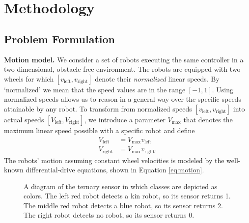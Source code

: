 \documentclass[letterpaper, 10 pt, conference]{ieeeconf}
\newcommand{\myparagraph}[1]{\textbf{#1.}}
\begin{document}
\section{Methodology}

\subsection{Problem Formulation}

\newcommand{\vL}{\ensuremath{v_{\text{left}}}}
\newcommand{\vR}{\ensuremath{v_{\text{right}}}}
\newcommand{\vaL}{\ensuremath{V_{\text{left}}}}
\newcommand{\vaR}{\ensuremath{V_{\text{right}}}}
\newcommand{\VM}{\ensuremath{V_{\text{max}}}}
\myparagraph{Motion model}
We consider a set of robots executing the same controller in a two-dimensional,
obstacle-free environment. The robots are equipped with two wheels for which
$[\vL,\vR]$ denote their \emph{normalized} linear speeds. By `normalized' we
mean that the speed values are in the range $[-1, 1]$. Using normalized speeds
allows us to reason in a general way over the specific speeds attainable by any
robot. To transform from normalized speeds $[\vL,\vR]$ into actual speeds
$[\vaL,\vaR]$, we introduce a parameter $\VM$ that denotes the maximum linear
speed possible with a specific robot and define
\begin{align}
  \vaL &= \VM \vL\\
  \vaR &= \VM \vR.
\end{align}
The robots' motion assuming constant wheel velocities is modeled by the well-known differential-drive
equations, shown in Equation \eqref{eq:motion}.

\newcommand{\vPN}[2]{\ensuremath{v_{\text{#1}}}^{S=#2}}
\newcommand{\robot}[2]{%
  \filldraw[draw=#2,fill=#2!20] (#1) circle(5mm);
  \draw[draw=#2,->,-Stealth,rotate around={0:(#1)}] (#1) -- +(5mm,0);
  \fill[fill=gray!20] ($(#1)+(5mm,0)$) -- +( 45:1cm) -- +(-45:1cm) -- cycle;%
  \fill[fill=#2] ($(#1)+(5mm,0)$) circle (1mm);%
  }

\begin{figure}[t]
  \centering
  \caption{A diagram of the ternary sensor in which classes are depicted
  as colors. The left red robot detects a kin robot, so its sensor
  returns 1. The middle red robot detects a blue robot, so its sensor
  returns 2. The right robot detects no robot, so its sensor returns
  0.}
  \label{fig:sensor}
\end{figure}
\end{document}
